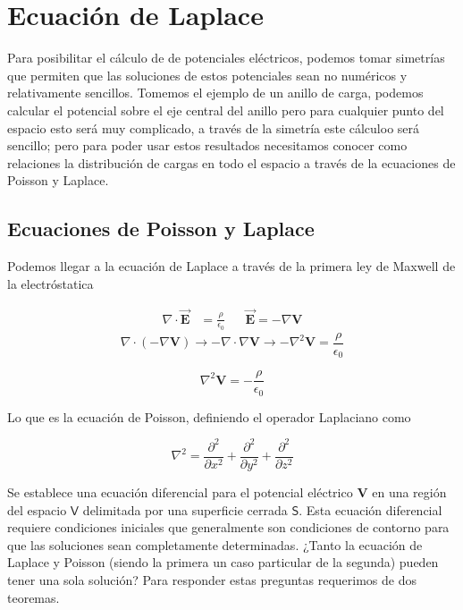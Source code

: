 \documentclass[a4,12pt]{aleph-notas}
\begin{document}
\encabezado

\section{Ecuación de Laplace}
Para posibilitar el cálculo de de potenciales eléctricos, podemos tomar simetrías que permiten que las soluciones de estos potenciales sean no numéricos y relativamente sencillos. Tomemos el ejemplo de un anillo de carga, podemos calcular el potencial sobre el eje central del anillo pero para cualquier punto del espacio esto será muy complicado, a través de la simetría este cálculoo será sencillo; pero para poder usar estos resultados necesitamos conocer como relaciones la distribución de cargas en todo el espacio a través de la ecuaciones de Poisson y Laplace.
\subsection{Ecuaciones de Poisson y Laplace}

Podemos llegar a la ecuación de Laplace a través de la primera ley de Maxwell de la electróstatica

\begin{align*}
    \nabla \cdot \vec{\mathbf{E}}&= \frac{\rho}{\epsilon_0} && \vec{\mathbf{E}}=-\nabla\mathbf{V}
\end{align*}
$$\nabla \cdot ( -\nabla \mathbf{V} ) \rightarrow-\nabla\cdot\nabla\mathbf{V}\rightarrow -\nabla^2\mathbf{V}=\frac{\rho}{\epsilon_0}$$

\begin{equation}\label{Poisson}
    \nabla^2\mathbf{V}=-\frac{\rho}{\epsilon_0}
\end{equation}

Lo que es la ecuación de Poisson, definiendo el operador Laplaciano como

\begin{equation}\label{Laplaciano}
    \nabla^2=\frac{\partial^2}{\partial x^2}+\frac{\partial^2}{\partial y^2}+\frac{\partial^2}{\partial z^2}
\end{equation}

Se establece una ecuación diferencial para el potencial eléctrico $\mathbf{V}$ en una región del espacio $\mathsf{V}$ delimitada por una superficie cerrada $\mathsf{S}$. Esta ecuación diferencial requiere condiciones iniciales que generalmente son condiciones de contorno para que las soluciones sean completamente determinadas. 
¿Tanto la ecuación de Laplace y Poisson (siendo la primera un caso particular de la segunda) pueden tener una sola solución? Para responder estas preguntas requerimos de dos teoremas.
\end{document}
